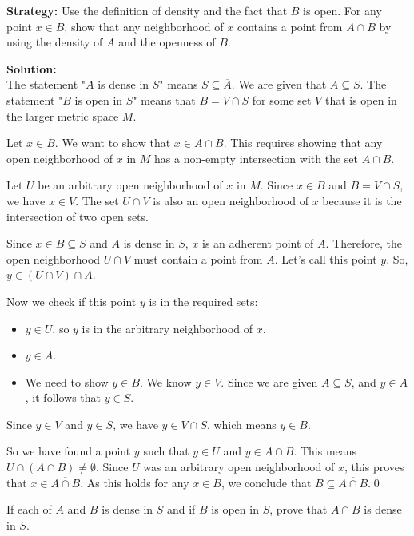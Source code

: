 \noindent\textbf{Strategy:} Use the definition of density and the fact that $B$ is open. For any point $x \in B$, show that any neighborhood of $x$ contains a point from $A \cap B$ by using the density of $A$ and the openness of $B$.

\bigskip\noindent\textbf{Solution:}\\
The statement "$A$ is dense in $S$" means $S \subseteq \overline{A}$. We are given that $A \subseteq S$.
The statement "$B$ is open in $S$" means that $B = V \cap S$ for some set $V$ that is open in the larger metric space $M$.

Let $x \in B$. We want to show that $x \in \overline{A \cap B}$. This requires showing that any open neighborhood of $x$ in $M$ has a non-empty intersection with the set $A \cap B$.

Let $U$ be an arbitrary open neighborhood of $x$ in $M$.
Since $x \in B$ and $B = V \cap S$, we have $x \in V$.
The set $U \cap V$ is also an open neighborhood of $x$ because it is the intersection of two open sets.

Since $x \in B \subseteq S$ and $A$ is dense in $S$, $x$ is an adherent point of $A$. Therefore, the open neighborhood $U \cap V$ must contain a point from $A$. Let's call this point $y$.
So, $y \in (U \cap V) \cap A$.

Now we check if this point $y$ is in the required sets:
\begin{itemize}
    \item $y \in U$, so $y$ is in the arbitrary neighborhood of $x$.
    \item $y \in A$.
    \item We need to show $y \in B$. We know $y \in V$. Since we are given $A \subseteq S$, and $y \in A$, it follows that $y \in S$.
\end{itemize}
Since $y \in V$ and $y \in S$, we have $y \in V \cap S$, which means $y \in B$.

So we have found a point $y$ such that $y \in U$ and $y \in A \cap B$. This means $U \cap (A \cap B) \neq \emptyset$.
Since $U$ was an arbitrary open neighborhood of $x$, this proves that $x \in \overline{A \cap B}$.
As this holds for any $x \in B$, we conclude that $B \subseteq \overline{A \cap B}$.\qed


\begin{problembox}
\begin{problemstatement}
If each of \( A \) and \( B \) is dense in \( S \) and if \( B \) is open in \( S \), prove that \( A \cap B \) is dense in \( S \).
\end{problemstatement}
\end{problembox}

